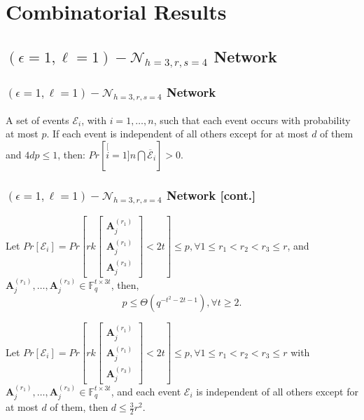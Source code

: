 \documentclass[c]{beamer}
\begin{document}
\section{Combinatorial Results}
\subsection{$\left(\epsilon=1,\ell=1\right)-\mathcal{N}_{h=3,r,s=4}$ Network}
\begin{frame}[c]
\frametitle{$\left(\epsilon=1,\ell=1\right)-\mathcal{N}_{h=3,r,s=4}$ Network}
	\begin{lemma}
 A set of events $\mathcal{E}_{i}$, with $i=1,\ldots,n$, such that
each event occurs with probability at most $p$. If each event is
independent of all others except for at most $d$ of them and $4dp\leq1$,
then: $Pr\left[\stackrel[i=1]{n}{\bigcap}\overline{\mathcal{E}}_{i}\right]>0$.
\label{thm:LLL}
	\end{lemma}
\end{frame}

\begin{frame}[c]
\frametitle{$\left(\epsilon=1,\ell=1\right)-\mathcal{N}_{h=3,r,s=4}$ Network [cont.]}

	\begin{lemma}
\label{lem:prob_p_LLL_formula}{\footnotesize{} Let $Pr\left[\mathcal{E}_{i}\right]=Pr\left[rk\left[\begin{array}{c}
\boldsymbol{A}_{j}^{\left(r_{1}\right)}\\
\boldsymbol{A}_{j}^{\left(r_{1}\right)}\\
\boldsymbol{A}_{j}^{\left(r_{3}\right)}
\end{array}\right]<2t\right]\leq p,\forall1\leq r_{1}<r_{2}<r_{3}\leq r$, and $\boldsymbol{A}_{j}^{\left(r_{1}\right)},\ldots,\boldsymbol{A}_{j}^{\left(r_{3}\right)}\in\ensuremath{\mathbb{F}}_{q}^{t\times3t}$,
then, 
\[
p\leq\Theta\left(q^{-t^{2}-2t-1}\right),\forall t\geq2.
\]
}{\footnotesize\par}
	\end{lemma}
	\begin{lemma}
{\footnotesize{} Let $Pr\left[\mathcal{E}_{i}\right]=Pr\left[rk\left[\begin{array}{c}
\boldsymbol{A}_{j}^{\left(r_{1}\right)}\\
\boldsymbol{A}_{j}^{\left(r_{1}\right)}\\
\boldsymbol{A}_{j}^{\left(r_{3}\right)}
\end{array}\right]<2t\right]\leq p,\forall1\leq r_{1}<r_{2}<r_{3}\leq r$ with $\boldsymbol{A}_{j}^{\left(r_{1}\right)},\ldots,\boldsymbol{A}_{j}^{\left(r_{3}\right)}\in\ensuremath{\mathbb{F}}_{q}^{t\times3t}$,
and each event $\mathcal{E}_{i}$ is independent of all others except
for at most $d$ of them, then $d\leq\frac{3}{2}r^{2}$. \label{lem:dependecy_d_LLL}
}{\footnotesize\par}
	\end{lemma}
\end{frame}
\end{document}
